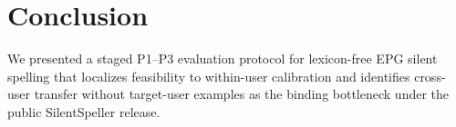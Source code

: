 \section{Conclusion}
\label{sec:conclusion}

We presented a staged P1--P3 evaluation protocol for lexicon-free EPG silent spelling that localizes feasibility to within-user calibration and identifies cross-user transfer without target-user examples as the binding bottleneck under the public SilentSpeller release.
